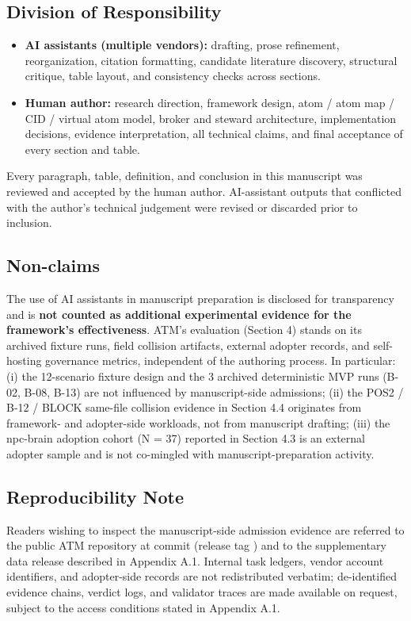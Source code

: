 \documentclass[a4paper,fontset=none]{ctexart}
\begin{document}
\subsection*{Division of Responsibility}

\begin{itemize}
\item \textbf{AI assistants (multiple vendors):} drafting, prose refinement, reorganization, citation formatting, candidate literature discovery, structural critique, table layout, and consistency checks across sections.
\item \textbf{Human author:} research direction, framework design, atom / atom map / CID / virtual atom model, broker and steward architecture, implementation decisions, evidence interpretation, all technical claims, and final acceptance of every section and table.
\end{itemize}

Every paragraph, table, definition, and conclusion in this manuscript was reviewed and accepted by the human author. AI-assistant outputs that conflicted with the author's technical judgement were revised or discarded prior to inclusion.

\subsection*{Non-claims}

The use of AI assistants in manuscript preparation is disclosed for transparency and is \textbf{not counted as additional experimental evidence for the framework's effectiveness}. ATM's evaluation (Section 4) stands on its archived fixture runs, field collision artifacts, external adopter records, and self-hosting governance metrics, independent of the authoring process. In particular: (i) the 12-scenario fixture design and the 3 archived deterministic MVP runs (B-02, B-08, B-13) are not influenced by manuscript-side admissions; (ii) the POS2 / B-12 / BLOCK same-file collision evidence in Section 4.4 originates from framework- and adopter-side workloads, not from manuscript drafting; (iii) the npc-brain adoption cohort (N = 37) reported in Section 4.3 is an external adopter sample and is not co-mingled with manuscript-preparation activity.

\subsection*{Reproducibility Note}

Readers wishing to inspect the manuscript-side admission evidence are referred to the public ATM repository at commit \texttt{} (release tag \texttt{}) and to the supplementary data release described in Appendix A.1. Internal task ledgers, vendor account identifiers, and adopter-side records are not redistributed verbatim; de-identified evidence chains, verdict logs, and validator traces are made available on request, subject to the access conditions stated in Appendix A.1.
\end{document}
